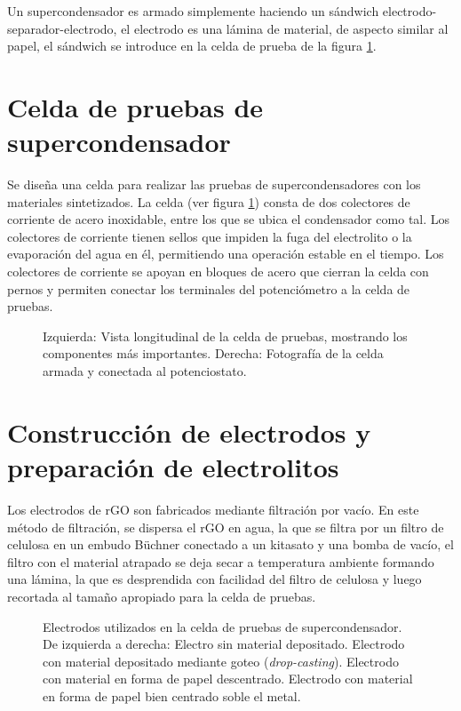 Un supercondensador es armado simplemente haciendo un sándwich electrodo-separador-electrodo, el electrodo es una lámina de material, de aspecto similar al papel, el sándwich se introduce en la celda de prueba de la figura \ref{fig:celda_de_pruebas_SC}. 

\section{Celda de pruebas de supercondensador}
Se diseña una celda para realizar las pruebas de supercondensadores con los materiales sintetizados. La celda (ver figura \ref{fig:celda_de_pruebas_SC}) consta de dos colectores de corriente de acero inoxidable, entre los que se ubica el condensador como tal. Los colectores de corriente tienen sellos que impiden la fuga del electrolito o la evaporación del agua en él, permitiendo una operación estable en el tiempo. Los colectores de corriente se apoyan en bloques de acero que cierran la celda con pernos y permiten conectar los terminales del potenciómetro a la celda de pruebas.

\begin{figure}[h!]
	\centering
	\caption{Izquierda: Vista longitudinal de la celda de pruebas, mostrando los componentes más importantes. Derecha: Fotografía de la celda armada y conectada al potenciostato.}
	\label{fig:celda_de_pruebas_SC}
\end{figure}

\section{Construcción de electrodos y preparación de electrolitos}
Los electrodos de rGO son fabricados mediante filtración por vacío. En este método de filtración, se dispersa el rGO en agua, la que se filtra por un filtro de celulosa en un embudo Büchner conectado a un kitasato y una bomba de vacío, el filtro con el material atrapado se deja secar a temperatura ambiente formando una lámina, la que es desprendida con facilidad del filtro de celulosa y luego recortada al tamaño apropiado para la celda de pruebas.

\begin{figure}
	\centering
	\caption{Electrodos utilizados en la celda de pruebas de supercondensador. De izquierda a derecha: Electro sin material depositado. Electrodo con material depositado mediante goteo (\emph{drop-casting}). Electrodo con material en forma de papel descentrado. Electrodo con material en forma de papel bien centrado soble el metal.}
	\label{fig:electrodes}
\end{figure}

